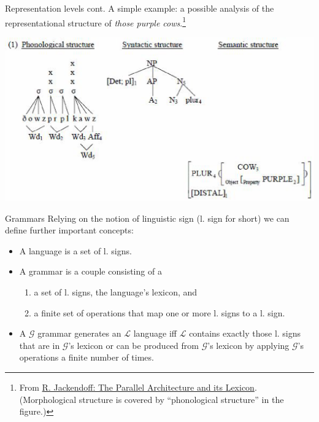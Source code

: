 \documentclass[style=upen, size=14pt]{powerdot}
\newcommand{\gold}{\color{arany}}
\begin{document}
\begin{slide}[toc=]{Representation levels cont.}
  A simple example: a possible analysis of the representational structure of
  \emph{those purple cows}.\footnote{From
    \href{http://web.stanford.edu/group/cslipublications/cslipublications/LFG/15/abstracts/lfg10abs-jackedoff.html}{R.
      Jackendoff: The Parallel Architecture and its Lexicon}. (Morphological
    structure is covered by ``phonological structure'' in the figure.)}
  
  \includegraphics[width=1\textwidth]{figures/jackendoff_diagram.eps}
\end{slide}

\begin{slide}[toc=Grammars]{Grammars}
  Relying on the notion of linguistic sign (l. sign for short) we can define
  further important concepts:
  \begin{itemize}
  \item A {\gold language} is a set of l. signs.
  \item A {\gold grammar} is a couple consisting of a
  \begin{enumerate}
  \item a set of l. signs, the language's {\gold lexicon}, and
  \item a finite set of operations that map one or more l. signs to a l. sign.
  \end{enumerate}
\item 
  A $\mathcal G$ grammar {\gold generates} an $\mathcal L$
  language iff $\mathcal L$ contains exactly those l. signs that are in
  $\mathcal G$'s lexicon or can be produced from $\mathcal G$'s lexicon by
  applying $\mathcal G$'s operations a finite number of times.
\end{itemize}
\end{slide}
\end{document}
